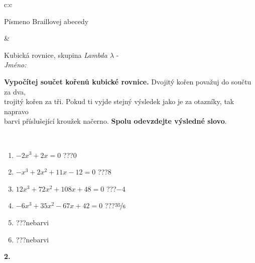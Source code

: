 \documentclass[10pt]{report}
\begin{document}
\begin{tabular}{c:c}
\begin{minipage}[c][104.5mm][t]{0.5\linewidth}
\begin{center}
\begin{minipage}{0.20\linewidth}
\begin{center}
{\small Písmeno Braillovej abecedy}
\end{center}
\end{minipage}
\end{center}
\end{minipage}
&
\begin{minipage}[c][104.5mm][t]{0.5\linewidth}
\begin{center}
\vspace{7mm}
{\huge Kubická rovnice, skupina \textit{Lambda $\lambda$} -}\\[5mm]
\textit{Jméno:}\phantom{xxxxxxxxxxxxxxxxxxxxxxxxxxxxxxxxxxxxxxxxxxxxxxxxxxxxxxxxxxxxxxxxx}\\[5mm]
\begin{minipage}{0.95\linewidth}
\begin{center}
\textbf{Vypočítej součet kořenů kubické rovnice.} Dvojitý kořen považuj do součtu za dva,\\trojitý kořen za tři. Pokud ti vyjde stejný výsledek jako je za otazníky, tak napravo\\barvi příslušející kroužek načerno. \textbf{Spolu odevzdejte výsledné slovo}.
\end{center}
\end{minipage}
\\[1mm]
\begin{minipage}{0.79\linewidth}
\begin{center}
\begin{varwidth}{\linewidth}
\begin{enumerate}
\Large
\item $-2x^3+2x=0$\quad \dotfill\; ???\;\dotfill \quad $0$
\item $-x^3+2x^2+11x-12=0$\quad \dotfill\; ???\;\dotfill \quad $8$
\item $12x^3+72x^2+108x+48=0$\quad \dotfill\; ???\;\dotfill \quad $-4$
\item $-6x^3+35x^2-67x+42=0$\quad \dotfill\; ???\;\dotfill \quad $\nicefrac{35}{6}$
\item \quad \dotfill\; ???\;\dotfill \quad nebarvi
\item \quad \dotfill\; ???\;\dotfill \quad nebarvi
\end{enumerate}
\end{varwidth}
\end{center}
\end{minipage}
\begin{minipage}{0.20\linewidth}
\begin{center}
{\Huge\bfseries 2.} \\[2mm]

\end{center}
\end{minipage}
\end{center}
\end{minipage}
\end{tabular}
\end{document}

